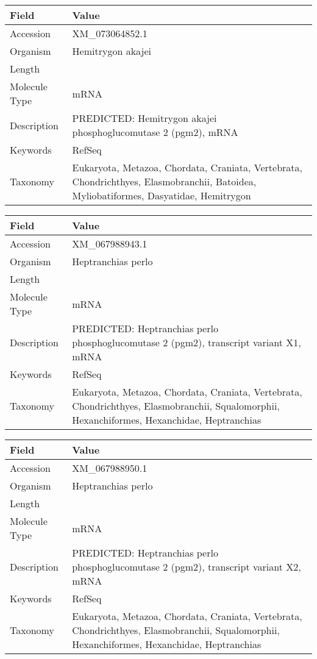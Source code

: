 \documentclass[10pt]{article}
\begin{document}
\vspace{1em}
{\footnotesize
\begin{longtable}{>{\raggedright\arraybackslash}p{4.5cm} >{\raggedright\arraybackslash}p{11.5cm}}
\textbf{Field} & \textbf{Value} \\
\hline
Accession & XM\_073064852.1 \\
Organism & Hemitrygon akajei \\
Length & 3634 \\
Molecule Type & mRNA \\
Description & PREDICTED: Hemitrygon akajei phosphoglucomutase 2 (pgm2), mRNA \\
Keywords & RefSeq \\
Taxonomy & Eukaryota, Metazoa, Chordata, Craniata, Vertebrata, Chondrichthyes, Elasmobranchii, Batoidea, Myliobatiformes, Dasyatidae, Hemitrygon \\
\end{longtable}
}

\vspace{1em}
{\footnotesize
\begin{longtable}{>{\raggedright\arraybackslash}p{4.5cm} >{\raggedright\arraybackslash}p{11.5cm}}
\textbf{Field} & \textbf{Value} \\
\hline
Accession & XM\_067988943.1 \\
Organism & Heptranchias perlo \\
Length & 4553 \\
Molecule Type & mRNA \\
Description & PREDICTED: Heptranchias perlo phosphoglucomutase 2 (pgm2), transcript variant X1, mRNA \\
Keywords & RefSeq \\
Taxonomy & Eukaryota, Metazoa, Chordata, Craniata, Vertebrata, Chondrichthyes, Elasmobranchii, Squalomorphii, Hexanchiformes, Hexanchidae, Heptranchias \\
\end{longtable}
}

\vspace{1em}
{\footnotesize
\begin{longtable}{>{\raggedright\arraybackslash}p{4.5cm} >{\raggedright\arraybackslash}p{11.5cm}}
\textbf{Field} & \textbf{Value} \\
\hline
Accession & XM\_067988950.1 \\
Organism & Heptranchias perlo \\
Length & 4498 \\
Molecule Type & mRNA \\
Description & PREDICTED: Heptranchias perlo phosphoglucomutase 2 (pgm2), transcript variant X2, mRNA \\
Keywords & RefSeq \\
Taxonomy & Eukaryota, Metazoa, Chordata, Craniata, Vertebrata, Chondrichthyes, Elasmobranchii, Squalomorphii, Hexanchiformes, Hexanchidae, Heptranchias \\
\end{longtable}
}
\end{document}
